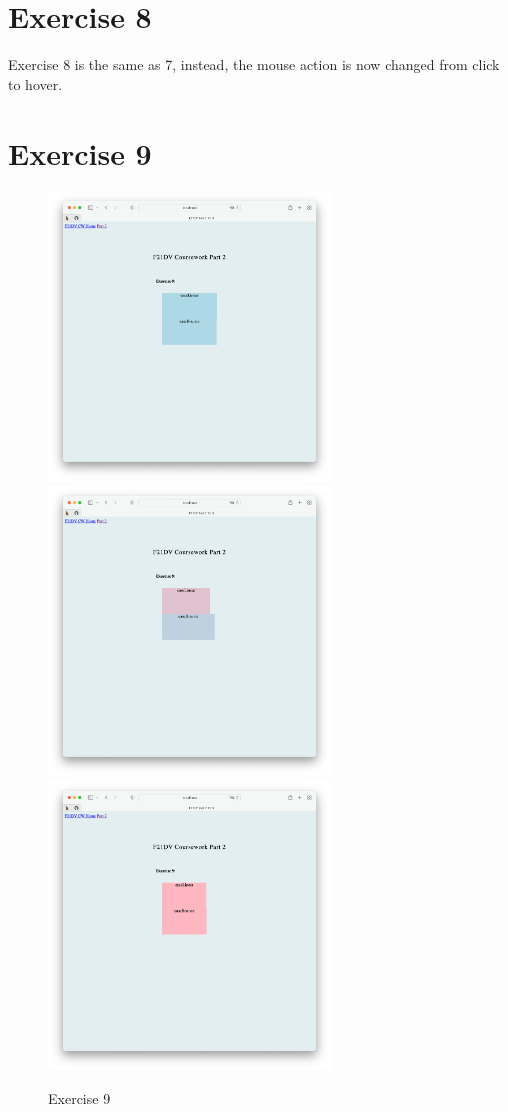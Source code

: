 \documentclass{scrreprt}
\begin{document}
\section{Exercise 8}
Exercise 8 is the same as 7, instead, the mouse action is now changed from click to hover.

\newpage
\section{Exercise 9}
\begin{figure}[!ht]
    \centering
    \includegraphics[width = 7.5cm]{images/ex9_1.png}
    \includegraphics[width = 7.5cm]{images/ex9_2.png}
    \includegraphics[width = 7.5cm]{images/ex9_3.png}
    \label{fig:ex9}
    \caption{Exercise 9}
\end{figure}
\end{document}
